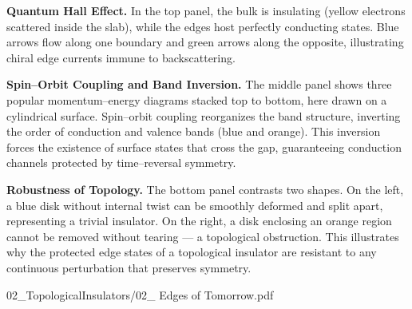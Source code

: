 \begin{SideNotePage}{

  \textbf{Quantum Hall Effect.} \; In the top panel, the bulk is insulating (yellow electrons scattered inside the slab), while the edges host perfectly conducting states. Blue arrows flow along one boundary and green arrows along the opposite, illustrating chiral edge currents immune to backscattering.

  \vspace{0.5em}
  \textbf{Spin–Orbit Coupling and Band Inversion.} \; The middle panel shows three popular momentum–energy diagrams stacked top to bottom, here drawn on a cylindrical surface. Spin–orbit coupling reorganizes the band structure, inverting the order of conduction and valence bands (blue and orange). This inversion forces the existence of surface states that cross the gap, guaranteeing conduction channels protected by time–reversal symmetry.

  \vspace{0.5em}
  \textbf{Robustness of Topology.} \; The bottom panel contrasts two shapes. On the left, a blue disk without internal twist can be smoothly deformed and split apart, representing a trivial insulator. On the right, a disk enclosing an orange region cannot be removed without tearing — a topological obstruction. This illustrates why the protected edge states of a topological insulator are resistant to any continuous perturbation that preserves symmetry.

}{02_TopologicalInsulators/02_ Edges of Tomorrow.pdf}
\end{SideNotePage}